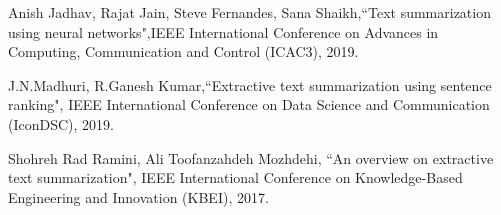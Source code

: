 \begin{thebibliography}{}

Anish Jadhav, Rajat Jain, Steve Fernandes, Sana Shaikh,``Text summarization using neural networks",IEEE International Conference on Advances in Computing, Communication and Control (ICAC3), 2019.

J.N.Madhuri, R.Ganesh Kumar,``Extractive text summarization using sentence ranking", IEEE International Conference on Data Science and Communication (IconDSC), 2019. 


Shohreh Rad Ramini, Ali Toofanzahdeh Mozhdehi, ``An overview on extractive text summarization", IEEE International Conference on Knowledge-Based Engineering and Innovation (KBEI), 2017. 

\end{thebibliography}
